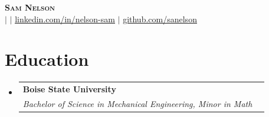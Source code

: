 \documentclass[letterpaper,10pt]{article}
\makeatletter
\newcommand{\resumeSubheading}[4]{
  \vspace{-2pt}\item
    \begin{tabular*}{0.97\textwidth}[t]{l@{\extracolsep{\fill}}r}
      \textbf{#1} & #2 \\
      \textit{\small#3} & \textit{\small #4} \\
    \end{tabular*}\vspace{-7pt}
}
\newcommand{\resumeSubHeadingListStart}{\begin{itemize}[leftmargin=0.15in, label={}]}
\newcommand{\resumeSubHeadingListEnd}{\end{itemize}}
\makeatother
\begin{document}

\begin{center}
    \textbf{\Huge \scshape Sam Nelson} \\ \vspace{1pt}
    \small \MYPHONE \vspace{1pt} $|$ \href{mailto:\MYEMAIL}{\uline{\MYEMAIL}} $|$ 
    \href{https://linkedin.com/in/nelson-sam}{\uline{linkedin.com/in/nelson-sam}} $|$
    \href{https://github.com/sanelson}{\uline{github.com/sanelson}}
\end{center}





\section{Education}
  \resumeSubHeadingListStart
    \resumeSubheading
      {Boise State University}{}
      {Bachelor of Science in Mechanical Engineering, Minor in Math}{}
  \resumeSubHeadingListEnd

\end{document}

